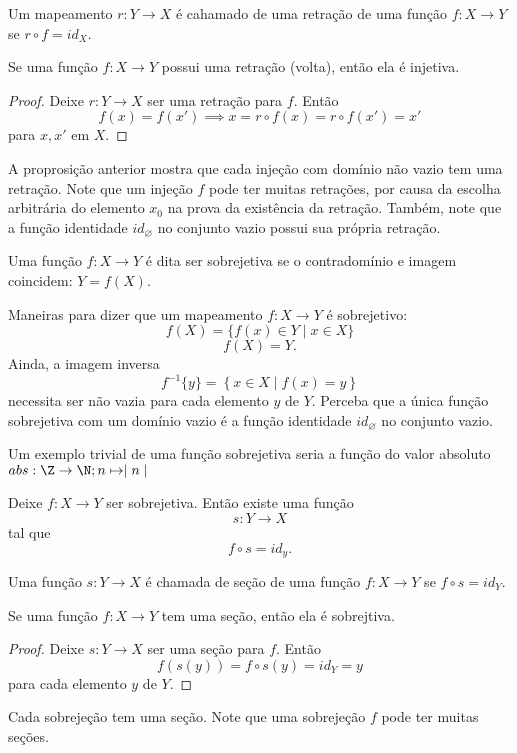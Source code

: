          \begin{definition}[Retração]
            Um mapeamento $r: Y \to X$ é cahamado de uma retração de uma função $f: X \to Y$ se $r\circ f = id_{X}.$
         \end{definition}
         \begin{stat}
            Se uma função $f: X \to Y$ possui uma retração (volta), então ela é injetiva.
         \end{stat}
         \begin{proof}
            Deixe $r: Y \to X$ ser uma retração para $f$. Então $$f(x) = f(x') \implies x=r\circ f(x) = r\circ f(x') = x'$$ para $x,x'$ em $X$.
         \end{proof}
         A proprosição anterior mostra que cada injeção com domínio não vazio tem uma retração. Note que um injeção $f$ pode ter muitas retrações, por causa da escolha arbitrária do elemento $x_{0}$ na prova da existência da retração. Também, note que a função identidade $id_{\varnothing}$ no conjunto vazio possui sua própria retração.

         \begin{definition}
            Uma função $f: X \to Y$ é dita ser sobrejetiva se o contradomínio e imagem coincidem: $Y = f(X)$.
         \end{definition}
         Maneiras para dizer que um mapeamento $f: X \to Y$ é sobrejetivo:
         $$f(X) = \{f(x) \in Y \mid x \in X\}$$
         $$f(X) = Y.$$
         Ainda, a imagem inversa $$f^{-1}\{y\} = \left\{x \in X \mid f(x) = y\right\}$$
         necessita ser não vazia para cada elemento $y$ de $Y$. Perceba que a única função sobrejetiva com um domínio vazio é a função identidade $id_{\varnothing}$ no conjunto vazio.

         Um exemplo trivial de uma função sobrejetiva seria a função do valor absoluto $abs: \Z \to \N; n \mapsto \mid n \mid$
         \begin{stat}
            Deixe $f: X \to Y$ ser sobrejetiva. Então existe uma função $$s: Y \to X$$ tal que $$f \circ s = id_{y}.$$
         \end{stat}
         \begin{definition}[Seções]
            Uma função $s: Y \to X$ é chamada de seção de uma função $f: X \to Y$ se $f \circ s = id_{Y}.$
         \end{definition}
         \begin{stat}
            Se uma função $f: X \to Y$ tem uma seção, então ela é sobrejtiva.
            \begin{proof}
               Deixe $s: Y\to X$ ser uma seção para $f$. Então $$f\left(s(y)\right) = f\circ s(y) = id_{Y} = y$$
               para cada elemento $y$ de $Y$.
            \end{proof}
         \end{stat}
         Cada sobrejeção tem uma seção. Note que uma sobrejeção $f$ pode ter muitas seções.

